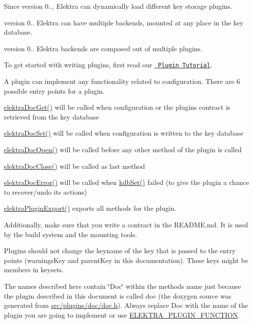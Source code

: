\begin{DoxySince}{Since}
version 0.., Elektra can dynamically load different key storage plugins.

version 0.. Elektra can have multiple backends, mounted at any place in the key database.

version 0.. Elektra backends are composed out of multiple plugins.
\end{DoxySince}
To get started with writing plugins, first read our \href{doc_tutorials_plugins_md.html}{\texttt{ Plugin Tutorial}}.

A plugin can implement any functionality related to configuration. There are 6 possible entry points for a plugin.
\begin{DoxyItemize}
\item \mbox{\hyperlink{group__plugin_gacb69f3441c6d84241b4362f958fbe313}{elektra\+Doc\+Get()}} will be called when configuration or the plugin\textquotesingle{}s contract is retrieved from the key database
\item \mbox{\hyperlink{group__plugin_gae65781a1deb34efc79c8cb9d9174842c}{elektra\+Doc\+Set()}} will be called when configuration is written to the key database
\item \mbox{\hyperlink{group__plugin_ga23c2eb3584e38a4d494eb8f91e5e3d8d}{elektra\+Doc\+Open()}} will be called before any other method of the plugin is called
\item \mbox{\hyperlink{group__plugin_ga1236aefe5b2baf8b7bf636ba5aa9ea29}{elektra\+Doc\+Close()}} will be called as last method
\item \mbox{\hyperlink{group__plugin_gad74b35f558ac7c3262f6069c5c47dc79}{elektra\+Doc\+Error()}} will be called when \mbox{\hyperlink{group__kdb_ga11436b058408f83d303ca5e996832bcf}{kdb\+Set()}} failed (to give the plugin a chance to recover/undo its actions)
\item \mbox{\hyperlink{group__plugin_ga8dd092048e972a3f0c9c9f54eb41576e}{elektra\+Plugin\+Export()}} exports all methods for the plugin.
\end{DoxyItemize}

Additionally, make sure that you write a contract in the R\+E\+A\+D\+M\+E.\+md. It is used by the build system and the mounting tools.

Plugins should not change the keyname of the key that is passed to the entry points (warnings\+Key and parent\+Key in this documentation). These keys might be members in keysets.

The names described here contain \char`\"{}\+Doc\char`\"{} within the method\textquotesingle{}s name just because the plugin described in this document is called doc (the doxygen source was generated from \mbox{\hyperlink{doc_8h}{src/plugins/doc/doc.\+h}}). Always replace Doc with the name of the plugin you are going to implement or use \mbox{\hyperlink{group__plugin_gacb05c902e4014535589db4193da87460}{E\+L\+E\+K\+T\+R\+A\+\_\+\+P\+L\+U\+G\+I\+N\+\_\+\+F\+U\+N\+C\+T\+I\+ON}}.

